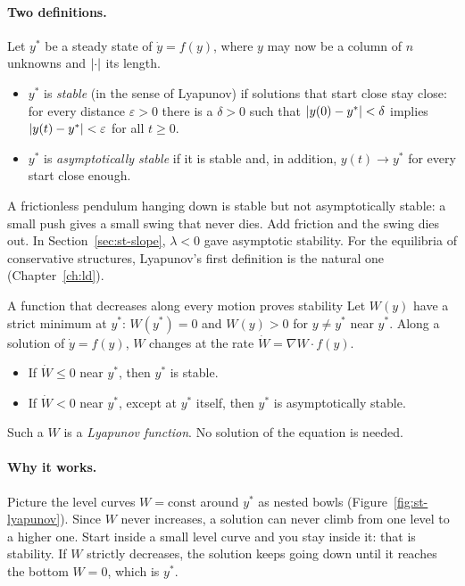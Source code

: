\paragraph{Two definitions.}
Let $y^*$ be a steady state of $\dot y = f(y)$, where $y$ may now be a column of
$n$ unknowns and $\lvert \cdot\rvert$ its length.
\begin{itemize}
  \item $y^*$ is \emph{stable} (in the sense of Lyapunov) if solutions that start
        close stay close: for every distance $\varepsilon > 0$ there is a
        $\delta > 0$ such that $\lvert y(0) - y^*\rvert < \delta$ implies
        $\lvert y(t) - y^*\rvert < \varepsilon$ for all $t \ge 0$.
  \item $y^*$ is \emph{asymptotically stable} if it is stable and, in addition,
        $y(t) \to y^*$ for every start close enough.
\end{itemize}
A frictionless pendulum hanging down is stable but not asymptotically stable: a
small push gives a small swing that never dies. Add friction and the swing dies
out. In Section~\ref{sec:st-slope}, $\lambda < 0$ gave asymptotic stability. For
the equilibria of conservative structures, Lyapunov's first definition is the
natural one (Chapter~\ref{ch:ld}).

\begin{gbox}{A function that decreases along every motion proves stability}\label{sec:st-lyapdirect}
%
Let $W(y)$ have a strict minimum at $y^*$: $W(y^*) = 0$ and $W(y) > 0$ for
$y \neq y^*$ near $y^*$. Along a solution of $\dot y = f(y)$, $W$ changes at the rate
$\dot W = \nabla W \cdot f(y)$.
\begin{itemize}
  \item If $\dot W \le 0$ near $y^*$, then $y^*$ is stable.
  \item If $\dot W < 0$ near $y^*$, except at $y^*$ itself, then $y^*$ is
        asymptotically stable.
\end{itemize}
Such a $W$ is a \emph{Lyapunov function}. No solution of the equation is needed.
\end{gbox}

\paragraph{Why it works.}
Picture the level curves $W = \text{const}$ around $y^*$ as nested bowls
(Figure~\ref{fig:st-lyapunov}). Since $W$ never increases, a solution can never
climb from one level to a higher one. Start inside a small level curve and you stay
inside it: that is stability. If $W$ strictly decreases, the solution keeps going
down until it reaches the bottom $W = 0$, which is $y^*$.

